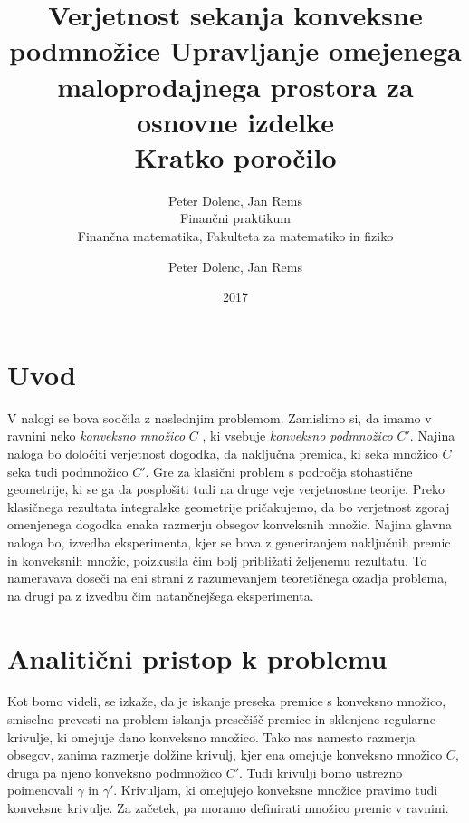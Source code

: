 \documentclass[a4paper]{article}
\title{Verjetnost sekanja konveksne podmnožice}
\author{Peter Dolenc, Jan Rems \\ Finančni praktikum \\ Finančna matematika, Fakulteta za matematiko in fiziko}
\date{2017}
\begin{document}
\title{%
  Upravljanje omejenega maloprodajnega prostora za osnovne izdelke \\
  \large Kratko poročilo \\}

\author{Peter Dolenc, Jan Rems}

\maketitle

\pagebreak

\section{Uvod}


V nalogi se bova soočila z naslednjim problemom. Zamislimo si, da imamo v ravnini neko \textit{konveksno množico} $C$ , ki vsebuje \textit{konveksno podmnožico } $C'$. Najina naloga bo določiti verjetnost dogodka, da naključna premica, ki seka množico $C$ seka tudi podmnožico $C'$. Gre za klasični problem s področja stohastične geometrije, ki se ga da posplošiti tudi na druge veje verjetnostne teorije. Preko klasičnega rezultata integralske geometrije pričakujemo, da bo verjetnost zgoraj omenjenega dogodka enaka razmerju obsegov konveksnih množic. Najina glavna naloga bo, izvedba eksperimenta, kjer se bova z generiranjem naključnih premic in konveksnih množic, poizkusila čim bolj približati željenemu rezultatu. To nameravava doseči na eni strani z razumevanjem teoretičnega ozadja problema, na drugi pa z izvedbu čim natančnejšega eksperimenta.

\vspace{4 mm}


\section{Analitični pristop k problemu}

Kot bomo videli, se izkaže, da je iskanje preseka premice s konveksno množico, smiselno prevesti na problem iskanja presečišč premice in sklenjene regularne krivulje, ki omejuje dano konveksno množico. Tako nas namesto razmerja obsegov, zanima razmerje dolžine krivulj, kjer ena omejuje konveksno množico $C$, druga pa njeno konveksno podmnožico $C'$. Tudi krivulji bomo ustrezno poimenovali $\gamma$ in $\gamma '$. Krivuljam, ki omejujejo konveksne množice pravimo tudi konveksne krivulje.  Za začetek, pa moramo definirati množico premic v ravnini.
\end{document}
